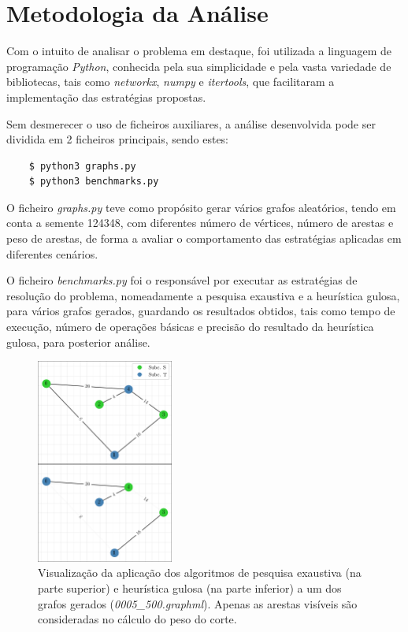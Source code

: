 \documentclass[mirror, portugues]{revdetua}
\begin{document}
\section{Metodologia da Análise}

Com o intuito de analisar o problema em destaque, foi utilizada a linguagem de programação \textit{Python}, conhecida pela sua simplicidade e pela vasta variedade de bibliotecas, tais como \textit{networkx}, \textit{numpy} e \textit{itertools}, que facilitaram a implementação das estratégias propostas.

Sem desmerecer o uso de ficheiros auxiliares, a análise desenvolvida pode ser dividida em 2 ficheiros principais, sendo estes:
\begin{verbatim}
    $ python3 graphs.py
    $ python3 benchmarks.py
\end{verbatim}

O ficheiro \textit{graphs.py} teve como propósito gerar vários grafos aleatórios, tendo em conta a semente 124348, com diferentes número de vértices, número de arestas e peso de arestas, de forma a avaliar o comportamento das estratégias aplicadas em diferentes cenários.

O ficheiro \textit{benchmarks.py} foi o responsável por executar as estratégias de resolução do problema, nomeadamente a pesquisa exaustiva e a heurística gulosa, para vários grafos gerados, guardando os resultados obtidos, tais como tempo de execução, número de operações básicas e precisão do resultado da heurística gulosa, para posterior análise.

\begin{figure}[h]
    \centering
    \includegraphics[width=0.4\textwidth]{../assets/exampGraph.png}
    \caption{Visualização da aplicação dos algoritmos de pesquisa exaustiva (na parte superior) e heurística gulosa (na parte inferior) a um dos grafos gerados (\textit{0005\_500.graphml}). Apenas as arestas visíveis são consideradas no cálculo do peso do corte.}
    \label{fig:exmpgraph2}
\end{figure}
\end{document}
